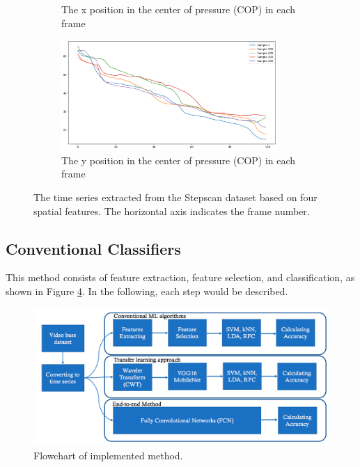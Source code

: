 \begin{figure}
\begin{subfigure}[b]{0.5\textwidth}
         \caption{The x position in the center of pressure (COP) in each frame}
         \label{fig:extracted_features_xCe}
     \end{subfigure}
     \hfill
     \begin{subfigure}[b]{0.5\textwidth}
         \centering
         \includegraphics[width=0.9\textwidth]{manuscript/src/figures/project/df_yCe.png}
         \caption{The y position in the center of pressure (COP) in each frame}
         \label{fig:extracted_features_yCe}
     \end{subfigure} 
        \caption{The time series extracted from the Stepscan dataset based on four spatial features. The horizontal axis indicates the frame number. }
        \label{fig:extracted_features}
\end{figure}


\subsection{Conventional Classifiers}


This method consists of feature extraction, feature selection, and classification, as shown in Figure \ref{fig:flow}. In the following, each step would be described. 
 

\begin{center}
	\begin{figure}[!t]
    	\centering
        \begin{minipage}[b]{\textwidth}
            \includegraphics[width=\textwidth]{manuscript/src/figures/project/flowchart.png}
        \end{minipage}
        \hspace{-1em}
        \caption{Flowchart of implemented method.}
        \label{fig:flow}
	\end{figure}
\end{center}

